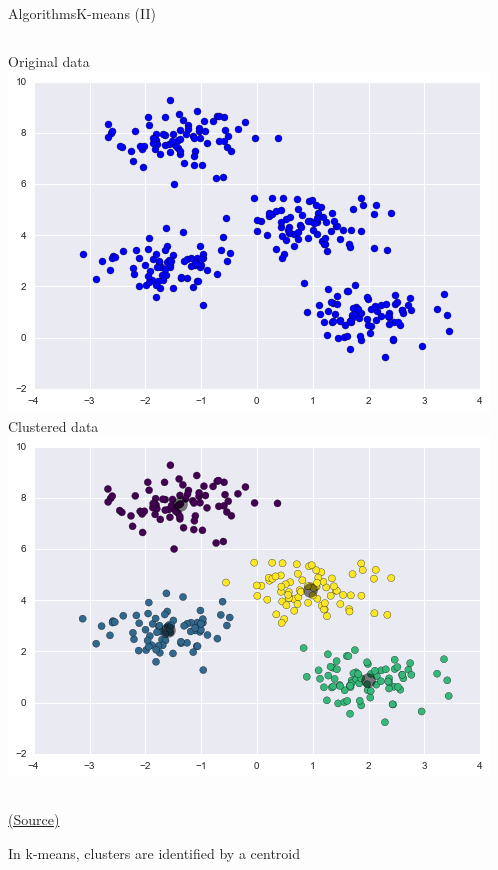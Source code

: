 \documentclass[10pt,compress]{beamer} %
\begin{document}
\begin{frame}{Algorithms}{K-means (II)}
    \begin{columns}
       \centering Original data\\
		\includegraphics[width=\textwidth]{figs/kmeans-1.png}
       \centering Clustered data\\
		\includegraphics[width=\textwidth]{figs/kmeans-2.png}
    \end{columns}

    \centering \tiny{\href{https://jakevdp.github.io/PythonDataScienceHandbook/05.11-k-means.html}{(Source)}}

    \normalsize
    \begin{flushleft}
    In k-means, clusters are identified by a \alert{centroid}
    \end{flushleft}
\end{frame}
\end{document}
